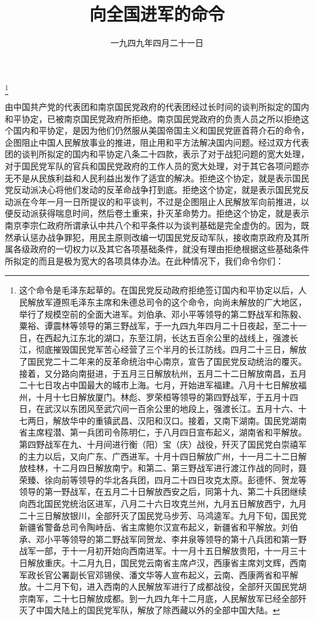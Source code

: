 
\title{向全国进军的命令}
\date{一九四九年四月二十一日}
\thanks{这个命令是毛泽东起草的。在国民党反动政府拒绝签订国内和平协定以后，人民解放军遵照毛泽东主席和朱德总司令的这个命令，向尚未解放的广大地区，举行了规模空前的全面大进军。刘伯承、邓小平等领导的第二野战军和陈毅、粟裕、谭震林等领导的第三野战军，于一九四九年四月二十日夜起，至二十一日，在西起九江东北的湖口，东至江阴，长达五百余公里的战线上，强渡长江，彻底摧毁国民党军苦心经营了三个半月的长江防线。四月二十三日，解放了国民党二十二年来的反革命统治中心南京，宣告了国民党反动统治的覆灭。接着，又分路向南挺进，于五月三日解放杭州，五月二十二日解放南昌，五月二十七日攻占中国最大的城市上海。七月，开始进军福建。八月十七日解放福州，十月十七日解放厦门。林彪、罗荣桓等领导的第四野战军，于五月十四日，在武汉以东团风至武穴间一百余公里的地段上，强渡长江。五月十六、十七两日，解放华中的重镇武昌、汉阳和汉口。接着，又南下湖南。国民党湖南省主席程潜、第一兵团司令陈明仁，于八月四日宣布起义，湖南省和平解放。第四野战军在九、十月间进行衡（阳）宝（庆）战役，歼灭了国民党白崇禧军的主力以后，又向广东、广西进军。十月十四日解放广州，十一月二十二日解放桂林，十二月四日解放南宁。和第二、第三野战军进行渡江作战的同时，聂荣臻、徐向前等领导的华北各兵团，四月二十四日攻克太原。彭德怀、贺龙等领导的第一野战军，在五月二十日解放西安之后，同第十九、第二十兵团继续向西北国民党统治区进军，八月二十六日攻克兰州，九月五日解放西宁，九月二十三日解放银川，全部歼灭了国民党马步芳、马鸿逵军。九月下旬，国民党新疆省警备总司令陶峙岳、省主席鲍尔汉宣布起义，新疆省和平解放。刘伯承、邓小平等领导的第二野战军同贺龙、李井泉等领导的第十八兵团和第一野战军一部，于十一月初开始向西南进军。十一月十五日解放贵阳，十一月三十日解放重庆。十二月九日，国民党云南省主席卢汉，西康省主席刘文辉，西南军政长官公署副长官邓锡侯、潘文华等人宣布起义，云南、西康两省和平解放。十二月下旬，进入西南的人民解放军进行了成都战役，全部歼灭国民党胡宗南军，二十七日解放成都。到一九四九年十二月底，人民解放军已经全部歼灭了中国大陆上的国民党军队，解放了除西藏以外的全部中国大陆。}
\maketitle



由中国共产党的代表团和南京国民党政府的代表团经过长时间的谈判所拟定的国内和平协定，已被南京国民党政府所拒绝。南京国民党政府的负责人员之所以拒绝这个国内和平协定，是因为他们仍然服从美国帝国主义和国民党匪首蒋介石的命令，企图阻止中国人民解放事业的推进，阻止用和平方法解决国内问题。经过双方代表团的谈判所拟定的国内和平协定八条二十四款，表示了对于战犯问题的宽大处理，对于国民党军队的官兵和国民党政府的工作人员的宽大处理，对于其它各项问题亦无不是从民族利益和人民利益出发作了适宜的解决。拒绝这个协定，就是表示国民党反动派决心将他们发动的反革命战争打到底。拒绝这个协定，就是表示国民党反动派在今年一月一日所提议的和平谈判，不过是企图阻止人民解放军向前推进，以便反动派获得喘息时间，然后卷土重来，扑灭革命势力。拒绝这个协定，就是表示南京李宗仁政府所谓承认中共八个和平条件以为谈判基础是完全虚伪的。因为，既然承认惩办战争罪犯，用民主原则改编一切国民党反动军队，接收南京政府及其所属各级政府的一切权力以及其它各项基础条件，就没有理由拒绝根据这些基础条件所拟定的而且是极为宽大的各项具体办法。在此种情况下，我们命令你们：

